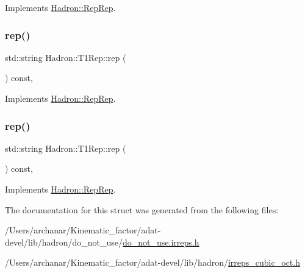 Implements \mbox{\hyperlink{structHadron_1_1RepRep_ab3213025f6de249f7095892109575fde}{Hadron\+::\+Rep\+Rep}}.

\mbox{\label{structHadron_1_1T1Rep_ad64cbc6c40d059a9cee94bab5f8614ce}} 
\subsubsection{\texorpdfstring{rep()}{rep()}\hspace{0.1cm}{\footnotesize\ttfamily [4/5]}}
{\footnotesize\ttfamily std\+::string Hadron\+::\+T1\+Rep\+::rep (\begin{DoxyParamCaption}{ }\end{DoxyParamCaption}) const\hspace{0.3cm}{\ttfamily [inline]}, {\ttfamily [virtual]}}



Implements \mbox{\hyperlink{structHadron_1_1RepRep_ab3213025f6de249f7095892109575fde}{Hadron\+::\+Rep\+Rep}}.

\mbox{\label{structHadron_1_1T1Rep_ad64cbc6c40d059a9cee94bab5f8614ce}} 
\subsubsection{\texorpdfstring{rep()}{rep()}\hspace{0.1cm}{\footnotesize\ttfamily [5/5]}}
{\footnotesize\ttfamily std\+::string Hadron\+::\+T1\+Rep\+::rep (\begin{DoxyParamCaption}{ }\end{DoxyParamCaption}) const\hspace{0.3cm}{\ttfamily [inline]}, {\ttfamily [virtual]}}



Implements \mbox{\hyperlink{structHadron_1_1RepRep_ab3213025f6de249f7095892109575fde}{Hadron\+::\+Rep\+Rep}}.



The documentation for this struct was generated from the following files\+:\begin{DoxyCompactItemize}
\item 
/\+Users/archanar/\+Kinematic\+\_\+factor/adat-\/devel/lib/hadron/do\+\_\+not\+\_\+use/\mbox{\hyperlink{adat-devel_2lib_2hadron_2do__not__use_2do__not__use_8irreps_8h}{do\+\_\+not\+\_\+use.\+irreps.\+h}}\item 
/\+Users/archanar/\+Kinematic\+\_\+factor/adat-\/devel/lib/hadron/\mbox{\hyperlink{adat-devel_2lib_2hadron_2irreps__cubic__oct_8h}{irreps\+\_\+cubic\+\_\+oct.\+h}}\end{DoxyCompactItemize}
